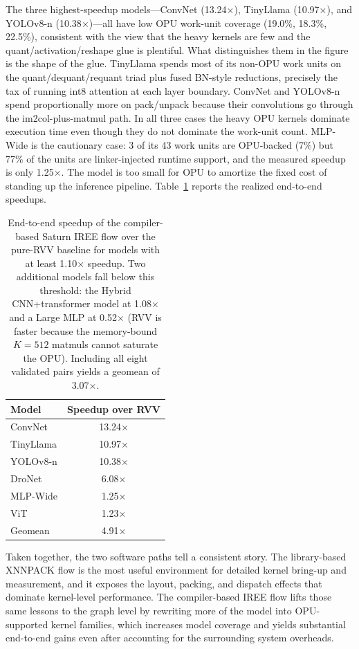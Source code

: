 The three highest-speedup models---ConvNet (13.24$\times$), TinyLlama (10.97$\times$), and YOLOv8-n (10.38$\times$)---all have low OPU work-unit coverage (19.0\%, 18.3\%, 22.5\%), consistent with the view that the heavy kernels are few and the quant/activation/reshape glue is plentiful. What distinguishes them in the figure is the shape of the glue. TinyLlama spends most of its non-OPU work units on the quant/dequant/requant triad plus fused BN-style reductions, precisely the tax of running int8 attention at each layer boundary. ConvNet and YOLOv8-n spend proportionally more on pack/unpack because their convolutions go through the im2col-plus-matmul path. In all three cases the heavy OPU kernels dominate execution time even though they do not dominate the work-unit count. MLP-Wide is the cautionary case: 3 of its 43 work units are OPU-backed (7\%) but 77\% of the units are linker-injected runtime support, and the measured speedup is only 1.25$\times$. The model is too small for OPU to amortize the fixed cost of standing up the inference pipeline. Table~\ref{tab:iree-model-speedup-rvv} reports the realized end-to-end speedups.

\begin{table}[t]
  \centering
  \small
  \setlength{\tabcolsep}{6pt}
  \begin{tabular}{lc}
    \hline
    Model & Speedup over RVV \\
    \hline
    ConvNet   & 13.24$\times$ \\
    TinyLlama & 10.97$\times$ \\
    YOLOv8-n  & 10.38$\times$ \\
    DroNet    & 6.08$\times$ \\
    MLP-Wide  & 1.25$\times$ \\
    ViT       & 1.23$\times$ \\
    \hline
    Geomean   & 4.91$\times$ \\
    \hline
  \end{tabular}
  \caption{End-to-end speedup of the compiler-based Saturn IREE flow over the pure-RVV baseline for models with at least 1.10$\times$ speedup. Two additional models fall below this threshold: the Hybrid CNN+transformer model at 1.08$\times$ and a Large MLP at 0.52$\times$ (RVV is faster because the memory-bound \(K\!=\!512\) matmuls cannot saturate the OPU). Including all eight validated pairs yields a geomean of 3.07$\times$.}
  \label{tab:iree-model-speedup-rvv}
\end{table}

Taken together, the two software paths tell a consistent story. The library-based XNNPACK flow is the most useful environment for detailed kernel bring-up and measurement, and it exposes the layout, packing, and dispatch effects that dominate kernel-level performance. The compiler-based IREE flow lifts those same lessons to the graph level by rewriting more of the model into OPU-supported kernel families, which increases model coverage and yields substantial end-to-end gains even after accounting for the surrounding system overheads.
